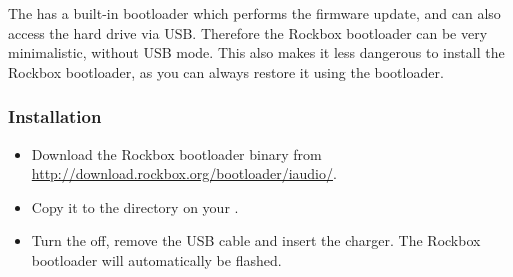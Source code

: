
The \playername{} has a built-in bootloader which performs the
firmware update, and can also access the hard drive via USB. Therefore the
Rockbox bootloader can be very minimalistic, without USB mode.
This also makes it less dangerous to install the Rockbox bootloader, as you can
always restore it using the \playerman{} bootloader.


\subsubsection{Installation}
\begin{itemize}
\item Download the Rockbox bootloader binary from 
\url{http://download.rockbox.org/bootloader/iaudio/}.
\item Copy it to the  directory on your \dap{}.
\item Turn the \dap{} off, remove the USB cable and insert the charger. The
Rockbox bootloader will automatically be flashed.
\end{itemize}
